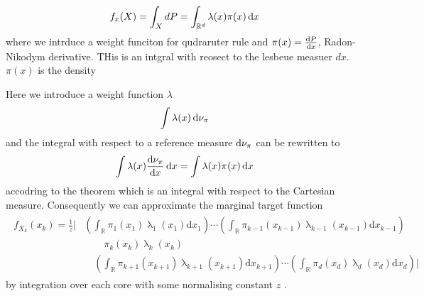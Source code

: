 \begin{align}
	f_x(X) = \int_{X} dP = \int_{\mathbb{R}^d} \lambda(x) \pi(x) \mathop{}\!\mathrm{d} x
\end{align}
where we intrduce a weight funciton for qudraruter rule and $\pi(x) = \frac{\mathop{}\!\mathrm{d} P}{\mathop{}\!\mathrm{d} x} $, Radon-Nikodym  derivative.
THis is an intgral with reosect to the lesbeue measuer $dx$.
$\pi(x)$ is the density 

Here we introduce a weight function $\lambda$
\begin{align}
	\int \lambda(x) \mathop{}\!\mathrm{d} \nu_{\pi}
\end{align}
and the integral with respect to a reference measure $\mathop{}\!\mathrm{d} \nu_{\pi}$ can be rewritten to
\begin{align}
	\int \lambda(x) \frac{\mathop{}\!\mathrm{d} \nu_{\pi} }{\mathop{}\!\mathrm{d} x} \mathop{}\!\mathrm{d} x = \int \lambda(x) \pi(x) \mathop{}\!\mathrm{d} x
\end{align}
accodring to the theorem which is an integral with respect to the Cartesian measure.
Consequently we can approximate the marginal target function
\begin{align}
	\begin{split}
	f_{X_k}(x_k) = \frac{1}{z}
	\Big|  &\left( \int_{\mathbb{R}} \pi_{1}(x_1) \uplambda_1(x_1)\text{d}x_{1} \right) \cdots \left( \int_{\mathbb{R}} \pi_{k-1}(x_{k-1}) \uplambda_{k-1}(x_{k-1}) \text{d}x_{k-1} \right) \\ & \qquad \pi_{k}(x_k)\uplambda_k(x_{k}) \\ &\quad \left( \int_{\mathbb{R}} \pi_{k+1}(x_{k+1})\uplambda_{k+1}(x_{k+1})\text{d}x_{k+1} \right) \cdots  \left( \int_{\mathbb{R}} \pi_{d}(x_d)\uplambda_d(x_{d})\text{d}x_d \right) \Big| \, 
	\end{split} 
\end{align}  
by integration over each core \cite{dolgov2020approximation} with some normalising constant $z$ \cite{cui2022deep}.
\\



